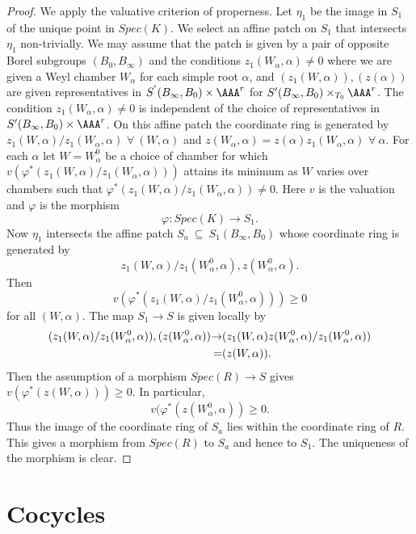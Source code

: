 \documentclass{memo-l}
\theoremstyle{definition}
\theoremstyle{remark}
\numberwithin{section}{chapter}
\numberwithin{equation}{chapter}
\begin{document}
\begin{proof} We apply the valuative criterion of properness.  Let
  ${\eta}_{1}$ be the image in $S_{1}$ of the unique point in
  $Spec(K)$.  We select an affine patch on $S_{1}$ that intersects
  ${\eta}_{1}$ non-trivially.  We may assume that the patch is given
  by a pair of opposite Borel subgroups $(B_{0},B_{{\infty}})$ and the
  conditions $z_{1}(W_{{\alpha}},{\alpha})\ne 0$ where we are given a
  Weyl chamber $W_{{\alpha}}$ for each simple root ${\alpha}$, and
  $(z_{1}(W,{\alpha})),(z({\alpha}))$ are given representatives in
  $S^{'}(B_{{\infty}},B_{0}) \times {\AAA}^{r}$ for
  $S'(B_{{\infty}},B_{0}) \times_{T_0} {\AAA}^{{r}}$.  The condition
  $z_{1}(W_{{\alpha}},{\alpha})\ne 0$ is independent of the choice of
  representatives in $S'(B_{{\infty}},B_{0}) \times {\AAA}^{{r}}$.  On
  this affine patch the coordinate ring is generated by
  $z_{1}(W,{\alpha})/z_{1}(W_{{\alpha}},{\alpha})$ $\forall \
  (W,{\alpha})$ and
  $z(W_{{\alpha}},{\alpha})=z(\alpha)z_1(W_\alpha,\alpha)$ $\forall\
  {\alpha}$.  For each ${\alpha}$ let $W=W_{{\alpha}}^{0}$ be a choice
  of chamber for which
  $v({\varphi}^{*}(z_{1}(W,{\alpha})/z_{1}(W_{{\alpha}},{\alpha})))$
  attains its minimum as $W$ varies over chambers such that
  ${\varphi}^{*}(z_{1}(W,{\alpha})/z_{1}(W_{{\alpha}},{\alpha}))\ne
  0$.  Here $v$ is the valuation and ${\varphi}$ is the morphism
$$
{\varphi}:Spec(K) {\to} S_{1} .
$$
Now ${\eta}_{1}$ intersects the affine patch $S_{a}\ {\subseteq}\
S_{1}(B_{{\infty}},B_{0})$ whose coordinate ring is generated by
$$z_{1}(W,{\alpha})/z_{1}(W_{{\alpha}}^{0},{\alpha}),
z(W_{{\alpha}}^{0},{\alpha}).$$
 Then
$$v({\varphi}^{*}(z_{1}(W,{\alpha})/z_{1}(W_{{\alpha}}^{0},{\alpha})))
\ge  0$$ for all $(W,{\alpha})$.
 The map $S_{1} {\to} S$ is given locally by
$$
\aligned
(z_{1}(W,{\alpha})/z_{1}(W_{{\alpha}}^{0},{\alpha})),(z(W_{{\alpha}}^{0},
{\alpha})) {\to} &(z_{1}(W,{\alpha})z(W_{{\alpha}}^{0},{\alpha})/z_{1}
(W_{{\alpha}}^{0},{\alpha}))\\ =& (z(W,{\alpha})) .
\endaligned
$$
Then the assumption of a morphism $Spec(R) {\to} S$ gives
$v({\varphi}^{*}(z(W,{\alpha}))) \ge  0$.
 In particular,
$$
v({\varphi}^{*}(z(W_{{\alpha}}^{0},{\alpha})) \ge  0 .
$$
Thus the image of the coordinate ring of $S_{a}$ lies within the coordinate
ring of $R$.
 This gives a morphism from $Spec(R)$ to $S_{a}$ and hence to $S_{1}$.
 The uniqueness of the morphism is clear.
\end{proof}

\section{{Cocycles}}
\end{document}
